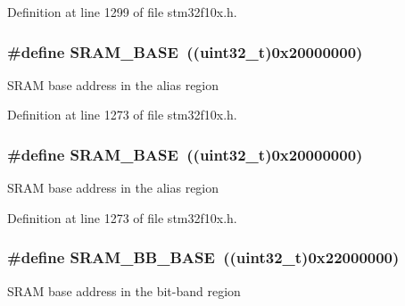 Definition at line 1299 of file stm32f10x.\+h.

\subsubsection[{\texorpdfstring{S\+R\+A\+M\+\_\+\+B\+A\+SE}{SRAM_BASE}}]{\setlength{\rightskip}{0pt plus 5cm}\#define S\+R\+A\+M\+\_\+\+B\+A\+SE~(({\bf uint32\+\_\+t})0x20000000)}\hypertarget{group___peripheral__memory__map_ga05e8f3d2e5868754a7cd88614955aecc}{}\label{group___peripheral__memory__map_ga05e8f3d2e5868754a7cd88614955aecc}
S\+R\+AM base address in the alias region 

Definition at line 1273 of file stm32f10x.\+h.

\subsubsection[{\texorpdfstring{S\+R\+A\+M\+\_\+\+B\+A\+SE}{SRAM_BASE}}]{\setlength{\rightskip}{0pt plus 5cm}\#define S\+R\+A\+M\+\_\+\+B\+A\+SE~(({\bf uint32\+\_\+t})0x20000000)}\hypertarget{group___peripheral__memory__map_ga05e8f3d2e5868754a7cd88614955aecc}{}\label{group___peripheral__memory__map_ga05e8f3d2e5868754a7cd88614955aecc}
S\+R\+AM base address in the alias region 

Definition at line 1273 of file stm32f10x.\+h.

\subsubsection[{\texorpdfstring{S\+R\+A\+M\+\_\+\+B\+B\+\_\+\+B\+A\+SE}{SRAM_BB_BASE}}]{\setlength{\rightskip}{0pt plus 5cm}\#define S\+R\+A\+M\+\_\+\+B\+B\+\_\+\+B\+A\+SE~(({\bf uint32\+\_\+t})0x22000000)}\hypertarget{group___peripheral__memory__map_gad3548b6e2f017f39d399358f3ac98454}{}\label{group___peripheral__memory__map_gad3548b6e2f017f39d399358f3ac98454}
S\+R\+AM base address in the bit-\/band region 

